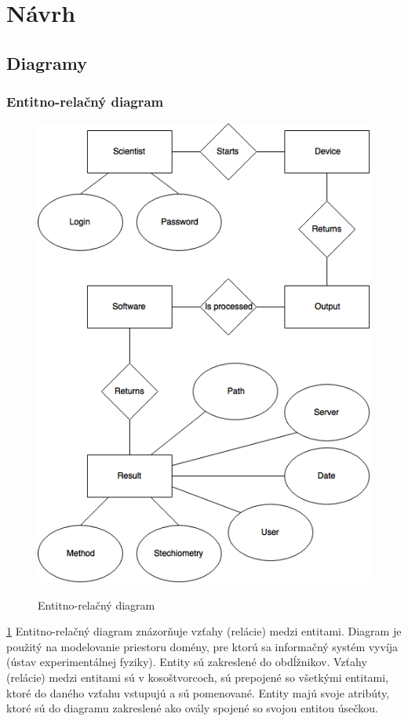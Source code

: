 \documentclass[12pt,a4paper]{article}
\begin{document}
\section{Návrh}

\subsection{Diagramy}

\subsubsection{Entitno-relačný diagram}
\begin{figure}[H]
	\caption{Entitno-relačný diagram}
	\includegraphics[width=\textwidth]{er_diagram}
	\label{fig:er_diagram}
\end{figure}
\ref{fig:er_diagram}
Entitno-relačný diagram znázorňuje vzťahy (relácie) medzi entitami. Diagram je použitý na modelovanie priestoru domény, pre ktorú sa informačný systém vyvíja (ústav experimentálnej fyziky). Entity sú zakreslené do obdĺžnikov. Vzťahy (relácie) medzi entitami sú v kosoštvorcoch, sú prepojené so všetkými entitami, ktoré do daného vzťahu vstupujú a sú pomenované. Entity majú svoje atribúty, ktoré sú do diagramu zakreslené ako ovály spojené so svojou entitou úsečkou.
\end{document}
